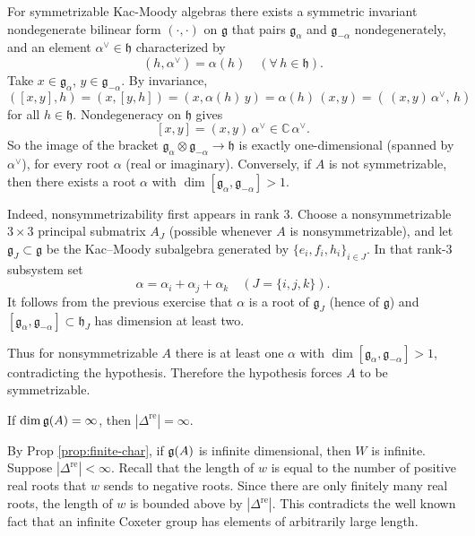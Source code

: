 \documentclass[12pt]{article}
\begin{document}
\begin{solution}
    For symmetrizable Kac-Moody algebras there exists a symmetric invariant nondegenerate bilinear form $(\cdot,\cdot)$ on $\mathfrak{g}$ that pairs $\mathfrak{g}_\alpha$ and $\mathfrak{g}_{-\alpha}$ nondegenerately, and an element $\alpha^\vee\in\mathfrak{h}$ characterized by
\[
    (h,\alpha^\vee)=\alpha(h) \quad (\forall\,h\in\mathfrak{h}).
\]
Take $x\in\mathfrak{g}_\alpha$, $y\in\mathfrak{g}_{-\alpha}$. By invariance,
\[
    ([x,y],h)=(x,[y,h])=(x,\alpha(h)\,y)=\alpha(h)\,(x,y)=(\,(x,y)\,\alpha^\vee,\,h)
\]
for all $h\in\mathfrak{h}$. Nondegeneracy on $\mathfrak{h}$ gives
\[
    [x,y]=(x,y)\,\alpha^\vee \in \mathbb{C}\,\alpha^\vee.
\]
So the image of the bracket $\mathfrak{g}_\alpha\otimes \mathfrak{g}_{-\alpha}\to \mathfrak{h}$ is exactly one-dimensional (spanned by $\alpha^\vee$), for every root $\alpha$ (real or imaginary). Conversely, if $A$ is not symmetrizable, then there exists a root $\alpha$ with $\dim[\mathfrak{g}_\alpha,\mathfrak{g}_{-\alpha}]>1$.

Indeed, nonsymmetrizability first appears in rank 3. Choose a nonsymmetrizable $3\times3$ principal submatrix $A_J$ (possible whenever $A$ is nonsymmetrizable), and let $\mathfrak{g}_J\subset \mathfrak{g}$ be the Kac–Moody subalgebra generated by $\{e_i,f_i,h_i\}_{i\in J}$. In that rank-3 subsystem set
\[
\alpha=\alpha_i+\alpha_j+\alpha_k\quad (J=\{i,j,k\}).
\]
It follows from the previous exercise that $\alpha$ is a root of $\mathfrak{g}_J$ (hence of $\mathfrak{g}$) and $[\mathfrak{g}_\alpha,\mathfrak{g}_{-\alpha}]\subset \mathfrak{h}_J$ has dimension at least two.

Thus for nonsymmetrizable $A$ there is at least one $\alpha$ with $\dim[\mathfrak{g}_\alpha,\mathfrak{g}_{-\alpha}]>1$, contradicting the hypothesis. Therefore the hypothesis forces $A$ to be symmetrizable.
\end{solution}

\begin{exercise}
    If $\dim \mathfrak{g}(A) = \infty$, then $|\Delta^{\mathrm{re}}| = \infty$.
\end{exercise}

\begin{solution}
    By Prop \ref{prop:finite-char}, if $\mathfrak{g}(A)$ is infinite dimensional, then $W$ is infinite. Suppose $|\Delta^{\mathrm{re}}|<\infty$. Recall that the length of $w$ is equal to the number of positive real roots that $w$ sends to negative roots. Since there are only finitely many real roots, the length of $w$ is bounded above by $|\Delta^{\mathrm{re}}|$. This contradicts the well known fact that an infinite Coxeter group has elements of arbitrarily large length.
\end{solution}
\end{document}
